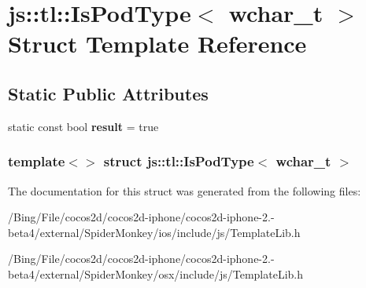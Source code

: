 \hypertarget{structjs_1_1tl_1_1_is_pod_type_3_01wchar__t_01_4}{\section{js\-:\-:tl\-:\-:Is\-Pod\-Type$<$ wchar\-\_\-t $>$ Struct Template Reference}
\label{structjs_1_1tl_1_1_is_pod_type_3_01wchar__t_01_4}
}
\subsection*{Static Public Attributes}
\begin{DoxyCompactItemize}
\item 
\hypertarget{structjs_1_1tl_1_1_is_pod_type_3_01wchar__t_01_4_abf2e47609a28930720245b5e63afdffa}{static const bool {\bfseries result} = true}\label{structjs_1_1tl_1_1_is_pod_type_3_01wchar__t_01_4_abf2e47609a28930720245b5e63afdffa}

\end{DoxyCompactItemize}
\subsubsection*{template$<$$>$ struct js\-::tl\-::\-Is\-Pod\-Type$<$ wchar\-\_\-t $>$}



The documentation for this struct was generated from the following files\-:\begin{DoxyCompactItemize}
\item 
/\-Bing/\-File/cocos2d/cocos2d-\/iphone/cocos2d-\/iphone-\/2.-\/beta4/external/\-Spider\-Monkey/ios/include/js/Template\-Lib.\-h\item 
/\-Bing/\-File/cocos2d/cocos2d-\/iphone/cocos2d-\/iphone-\/2.-\/beta4/external/\-Spider\-Monkey/osx/include/js/Template\-Lib.\-h\end{DoxyCompactItemize}
